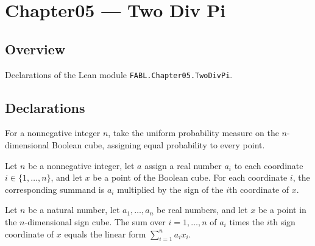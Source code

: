 \chapter{Chapter05 — Two Div Pi}
\section{Overview}

Declarations of the Lean module \texttt{FABL.Chapter05.TwoDivPi}.

\section{Declarations}

\begin{definition}
\label{FABL.twoDivPiRademacherMeasure}
\leanok
{}
For a nonnegative integer $n$, take the uniform probability measure on the
$n$-dimensional Boolean cube, assigning equal probability to every point.
\end{definition}

\begin{definition}
\label{FABL.twoDivPiRademacherSummand}
\leanok
{}
Let $n$ be a nonnegative integer, let $a$ assign a real number $a_i$ to each coordinate
$i\in\{1,\ldots,n\}$, and let $x$ be a point of the Boolean cube. For each coordinate
$i$, the corresponding summand is $a_i$ multiplied by the sign of the $i$th coordinate
of $x$.
\end{definition}

\begin{theorem}
\label{FABL.sum_twoDivPiRademacherSummand}
\leanok
{}
Let $n$ be a natural number, let $a_1,\ldots,a_n$ be real numbers, and let $x$ be a
point in the $n$-dimensional sign cube. The sum over $i=1,\ldots,n$ of $a_i$ times the
$i$th sign coordinate of $x$ equals the linear form $\sum_{i=1}^n a_i x_i$.
\end{theorem}

